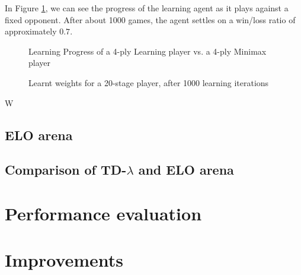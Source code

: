 \documentclass[11pt,twocolumn]{article}
\newcommand{\tdl}{TD-$\lambda$ }
\begin{document}
In Figure \ref{LearningProgress}, we can see the progress of the learning agent as it plays against a fixed opponent. After about 1000 games, the agent settles on a win/loss ratio of approximately $0.7$.
\begin{figure}[H]
    \caption{Learning Progress of a 4-ply Learning player vs. a 4-ply Minimax player}
    \label{LearningProgress}
\end{figure}

\begin{figure}[H]
    \caption{Learnt weights for a 20-stage player, after 1000 learning iterations}
    \label{WeightsOverTime}
\end{figure}W
\clearpage
\subsection{ELO arena}
\subsection{Comparison of \tdl and ELO arena}
\section{Performance evaluation}
\section{Improvements}




\end{document}
